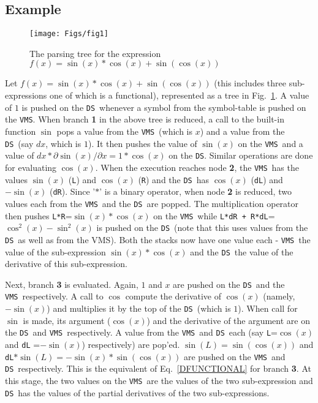 \documentclass[11pt]{article}
\newcommand{\DS}{{\tt DS}}
\newcommand{\VMS}{{\tt VMS}}
\begin{document}
\subsection{Example}
\begin{figure}[t]
\begin{center}
  \texttt{[image: Figs/fig1]}
\caption[]{The parsing tree for the expression $f(x)=\sin(x)*\cos(x) + \sin(\cos(x))$}
\label{EX1}
\end{center}
\end{figure}
Let $f(x)=\sin(x)*\cos(x) + \sin(\cos(x))$ (this includes three
sub-expressions one of which is a functional), represented as a tree
in Fig.~\ref{EX1}.  A value of $1$ is pushed on the \DS\ whenever a
symbol from the symbol-table is pushed on the \VMS.  When branch {\bf
1} in the above tree is reduced, a call to the built-in function
$\sin$ pops a value from the \VMS\ (which is $x$) and a value from the
\DS\ (say $dx$, which is $1$).  It then pushes the value of $\sin(x)$
on the \VMS\ and a value of $dx*\partial \sin(x) / \partial x =
1*\cos(x)$ on the \DS.  Similar operations are done for evaluating
$\cos(x)$.  When the execution reaches node {\bf 2}, the \VMS\ has the
values $\sin(x)$ ({\tt L}) and $\cos(x)$ ({\tt R}) and the \DS\ has
$\cos(x)$ ({\tt dL}) and $-\sin(x)$ ({\tt dR}).  Since '$*$' is a
binary operator, when node {\bf 2} is reduced, two values each from
the \VMS\ and the \DS\ are popped.  The multiplication operator then
pushes {\tt L*R}=$\sin(x)*\cos(x)$ on the \VMS\ while {\tt L*dR +
R*dL}=$\cos^2(x)-\sin^2(x)$ is pushed on the \DS\ (note that this uses
values from the \DS\ as well as from the VMS).  Both the stacks now
have one value each - \VMS\ the value of the sub-expression
$\sin(x)*\cos(x)$ and the \DS\ the value of the derivative of this
sub-expression.

Next, branch {\bf 3} is evaluated.  Again, $1$ and $x$ are pushed on
the \DS\ and the \VMS\ respectively.  A call to $\cos$ compute the
derivative of $\cos(x)$ (namely, $-\sin(x)$) and multiplies it by the
top of the \DS\ (which is $1$).  When call for $\sin$ is made, its
argument ($\cos(x)$) and the derivative of the argument are on the
\DS\ and \VMS\ respectively. A value from the \VMS\ and \DS\ each (say
{\tt L}=$\cos(x)$ and {\tt dL} =$-\sin(x)$) respectively) are pop'ed.
$\sin(L)=\sin(\cos(x))$ and {\tt dL}$*\sin(L)=-\sin(x)*\sin(\cos(x))$
are pushed on the \VMS\ and \DS\ respectively.  This is the equivalent
of Eq.~\ref{DFUNCTIONAL} for branch {\bf 3}.  At this stage, the two
values on the \VMS\ are the values of the two sub-expression and \DS\
has the values of the partial derivatives of the two sub-expressions.
\end{document}
